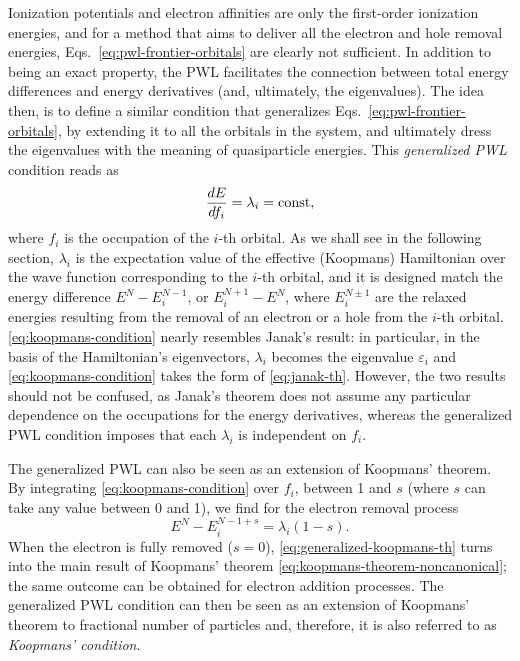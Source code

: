 Ionization potentials and electron affinities are only the first-order ionization energies, and for a method that aims to deliver all the electron and hole removal energies, Eqs.~\eqref{eq:pwl-frontier-orbitals} are clearly not sufficient. In addition to being an exact property, the PWL facilitates the connection between total energy differences and energy derivatives (and, ultimately, the eigenvalues). The idea then, is to define a similar condition that generalizes Eqs.~\eqref{eq:pwl-frontier-orbitals}, by extending it to all the orbitals in the system, and ultimately dress the eigenvalues with the meaning of quasiparticle energies. This \emph{generalized PWL} \cite{dabo_non-koopmans_2009,dabo_koopmans_2010} condition reads as
%
\begin{equation}
    \frac{dE}{df_i} = \lambda_i = {\rm const} ,
    \label{eq:koopmans-condition}
\end{equation}
%
where $f_i$ is the occupation of the $i$-th orbital. As we shall see in the following section, $\lambda_i$ is the expectation value of the effective (Koopmans) Hamiltonian over the wave function corresponding to the $i$-th orbital, and it is designed match the energy difference $E^N - E^{N-1}_i$, or $E^{N+1}_i - E^N$, where $E^{N \pm 1}_i$ are the relaxed energies resulting from the removal of an electron or a hole from the $i$-th orbital. \cref{eq:koopmans-condition} nearly resembles Janak's result: in particular, in the basis of the Hamiltonian's eigenvectors, $\lambda_i$ becomes the eigenvalue $\varepsilon_i$ and \cref{eq:koopmans-condition} takes the form of \cref{eq:janak-th}. However, the two results should not be confused, as Janak's theorem does not assume any particular dependence on the occupations for the energy derivatives, whereas the generalized PWL condition imposes that each $\lambda_i$ is independent on $f_i$.

The generalized PWL can also be seen as an extension of Koopmans' theorem. By integrating \cref{eq:koopmans-condition} over $f_i$, between 1 and $s$ (where $s$ can take any value between 0 and 1), we find for the electron removal process
%
\begin{equation}
    E^N - E^{N-1+s}_i = \lambda_i (1-s) .
    \label{eq:generalized-koopmans-th}
\end{equation}
%
When the electron is fully removed ($s=0$), \cref{eq:generalized-koopmans-th} turns into the main result of Koopmans' theorem \eqref{eq:koopmans-theorem-noncanonical}; the same outcome can be obtained for electron addition processes. The generalized PWL condition can then be seen as an extension of Koopmans' theorem to fractional number of particles and, therefore, it is also referred to as \emph{Koopmans' condition}.

